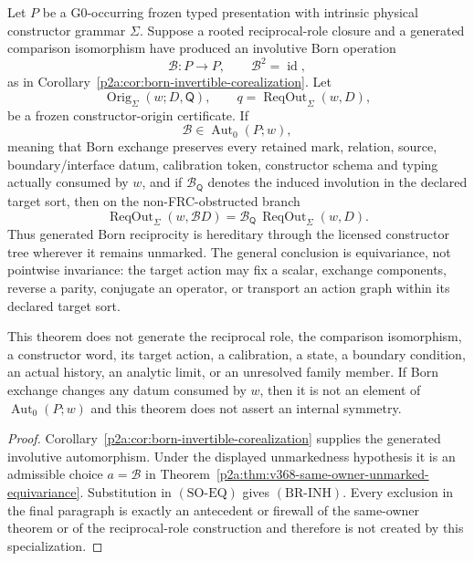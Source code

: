 \documentclass[12pt,a4paper]{article}
\begin{document}
\begin{theorem}
\label{p2a:thm:generated-born-inheritance}
Let \(P\) be a G0-occurring frozen typed presentation with intrinsic physical
constructor grammar \(\Sigma\).  Suppose a rooted reciprocal-role closure and
a generated comparison isomorphism have produced an involutive Born
operation
\[
 \mathcal B:P\longrightarrow P,
 \qquad \mathcal B^2=\operatorname{id},
\]
as in Corollary~\ref{p2a:cor:born-invertible-corealization}.  Let
\[
 \operatorname{Orig}_{\Sigma}(w;D,\mathsf Q),
 \qquad
 q=\operatorname{ReqOut}_{\Sigma}(w,D),
\]
be a frozen constructor-origin certificate.  If
\[
 \boxed{\mathcal B\in\operatorname{Aut}_0(P;w)},
\]
meaning that Born exchange preserves every retained mark, relation, source,
boundary/interface datum, calibration token, constructor schema and typing
actually consumed by \(w\), and if \(\mathcal B_{\mathsf Q}\) denotes the
induced involution in the declared target sort, then on the non-FRC-obstructed
branch
\[
 \boxed{
 \operatorname{ReqOut}_{\Sigma}(w,\mathcal B D)
 =\mathcal B_{\mathsf Q}\,
  \operatorname{ReqOut}_{\Sigma}(w,D).}
 \tag{BR-INH}
\]
Thus generated Born reciprocity is hereditary through the licensed
constructor tree wherever it remains unmarked.  The general conclusion is
equivariance, not pointwise invariance: the target action may fix a scalar,
exchange components, reverse a parity, conjugate an operator, or transport an
action graph within its declared target sort.

This theorem does not generate the reciprocal role, the comparison
isomorphism, a constructor word, its target action, a calibration, a state,
a boundary condition, an actual history, an analytic limit, or an unresolved
family member.  If Born exchange changes any datum consumed by \(w\), then it
is not an element of \(\operatorname{Aut}_0(P;w)\) and this theorem does not
assert an internal symmetry.
\end{theorem}

\begin{proof}
Corollary~\ref{p2a:cor:born-invertible-corealization} supplies the generated
involutive automorphism.  Under the displayed unmarkedness hypothesis it is
an admissible choice \(a=\mathcal B\) in
Theorem~\ref{p2a:thm:v368-same-owner-unmarked-equivariance}.  Substitution in
\((\mathrm{SO\text{-}EQ})\) gives \((\mathrm{BR\text{-}INH})\).  Every
exclusion in the final paragraph is exactly an antecedent or firewall of the
same-owner theorem or of the reciprocal-role construction and therefore is
not created by this specialization.
\end{proof}
\end{document}
